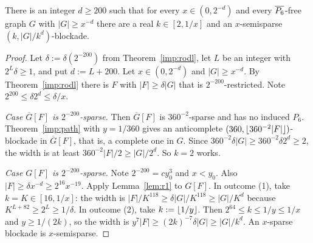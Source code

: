\begin{lemma}\label{lem:r1blockade}
There is an integer $d\ge200$ such that for every $x\in(0,2^{-d})$ and every $\overline{P_6}$-free graph $G$ with
$|G|\ge x^{-d}$ there are a real $k\in[2,1/x]$ and an $x$-semisparse $(k,|G|/k^d)$-blockade.
\end{lemma}
\begin{proof}
Let $\delta:=\delta(2^{-200})$ from Theorem~\ref{imp:rodl}, let $L$ be an integer with $2^L\delta\ge1$, and
put $d:=L+200$. Let $x\in(0,2^{-d})$ and $|G|\ge x^{-d}$. By Theorem~\ref{imp:rodl} there is $F$ with
$|F|\ge\delta|G|$ that is $2^{-200}$-restricted. Note $2^{200}\le\delta2^d\le\delta/x$.

\emph{Case $\overline{G}[F]$ is $2^{-200}$-sparse.} Then $\overline G[F]$ is $360^{-2}$-sparse and has no
induced $P_6$. Theorem~\ref{imp:path} with $y=1/360$ gives an anticomplete
$(360,\lfloor 360^{-2}|F|\rfloor)$-blockade in $\overline G[F]$, that is, a complete one in $G$. Since
$360^{-2}\delta|G|\ge360^{-2}\delta2^d\ge2$, the width is at least $360^{-2}|F|/2\ge|G|/2^d$. So $k=2$ works.

\emph{Case $G[F]$ is $2^{-200}$-sparse.} Note $2^{-200}=cy_0^3$ and $x<y_0$. Also $|F|\ge\delta x^{-d}\ge
2^{16}x^{-19}$. Apply Lemma~\ref{lem:r1} to $G[F]$. In outcome (1), take $k=K\in[16,1/x]$: the width is
$|F|/K^{118}\ge\delta|G|/K^{118}\ge|G|/K^{d}$ because $K^{L+82}\ge2^L\ge1/\delta$. In outcome (2), take
$k:=\lfloor 1/y\rfloor$. Then $2^{64}\le k\le1/y\le1/x$ and $y\ge1/(2k)$, so the width is $y^7|F|\ge
(2k)^{-7}\delta|G|\ge|G|/k^d$. An $x$-sparse blockade is $x$-semisparse.
\end{proof}
